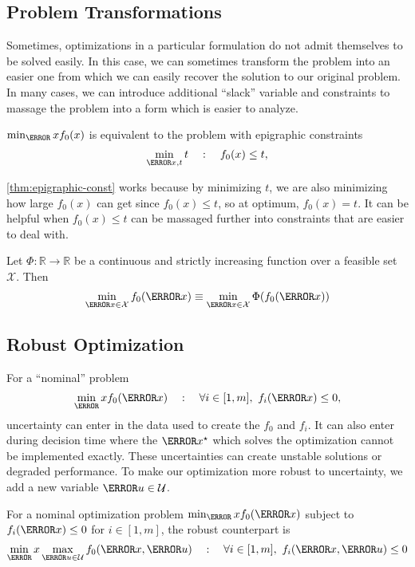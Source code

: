 \subsection{Problem Transformations}
Sometimes, optimizations in a particular formulation do not admit themselves to be solved easily.
In this case, we can sometimes transform the problem into an easier one from which we can easily recover the solution to our original problem.
In many cases, we can introduce additional ``slack'' variable and constraints to massage the problem into a form which is easier to analyze.
\begin{theorem}
	$\min_\V{x} f_0(x)$ is equivalent to the problem with epigraphic constraints
	\[
		\min_{\V{x}, t} t \quad : \quad f_0(x) \leq t,
	\]
	\label{thm:epigraphic-const}
\end{theorem}
\cref{thm:epigraphic-const} works because by minimizing $t$, we are also minimizing how large $f_0(x)$ can get since $f_0(x) \leq t$, so at optimum, $f_0(x) = t$.
It can be helpful when $f_0(x) \leq t$ can be massaged further into constraints that are easier to deal with.
\begin{theorem}
	Let $\Phi:\mathbb{R}\to\mathbb{R}$ be a continuous and strictly increasing function over a feasible set $\mathcal{X}$. Then \[
		\min_{\V{x}\in\mathcal{X}}f_0(\V{x}) \equiv \min_{\V{x}\in\mathcal{X}} \Phi(f_0(\V{x}))
	\]
	\label{thm:monotone-increasing}
\end{theorem}
\subsection{Robust Optimization}
For a ``nominal'' problem \[
	\min_\V{x} f_0(\V{x}) \quad : \quad \forall i\in[1,m],\ f_i(\V{x}) \leq 0,
\]
uncertainty can enter in the data used to create the $f_0$ and $f_i$.
It can also enter during decision time where the $\V{x}^\star$ which solves the optimization cannot be implemented exactly.
These uncertainties can create unstable solutions or degraded performance.
To make our optimization more robust to uncertainty, we add a new variable $\V{u}\in\mathcal{U}$.
\begin{definition}
	For a nominal optimization problem $\min_\V{x} f_0(\V{x})$ subject to $f_i(\V{x}) \leq 0$ for $i\in[1,m]$, the robust counterpart is \[
		\min_\V{x} \max_{\V{u}\in\mathcal{U}} f_0(\V{x}, \V{u}) \quad : \quad \forall i\in[1,m],\ f_i(\V{x}, \V{u}) \leq 0
	\]
	\label{defn:robust-counterpart}
\end{definition}
